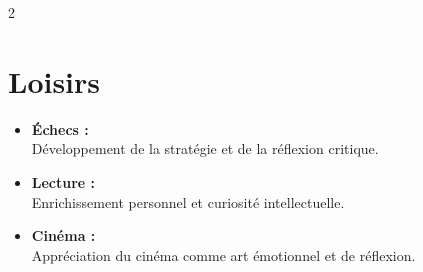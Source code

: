 \documentclass[11pt,asfal]{amdresume}
\begin{document}
\begin{paracol}{2}
\section{Loisirs}
\begin{itemize}[left=0.6cm]
    \item[\king] \textbf{Échecs :} \\ Développement de la stratégie et de la réflexion critique.
    \item[\faBook] \textbf{Lecture :} \\ Enrichissement personnel et curiosité intellectuelle.
    \item[\faTv] \textbf{Cinéma :} \\ Appréciation du cinéma comme art émotionnel et de réflexion.
\end{itemize}
 
\end{paracol}
\end{document}

